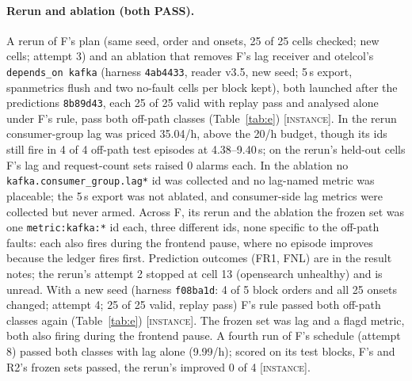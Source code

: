 \documentclass{ceurart}
\newcommand{\scope}[1]{\textsc{[#1]}}
\begin{document}
\paragraph{Rerun and ablation (both PASS).} %
A rerun of F's plan (same seed, order and onsets, 25 of 25 cells checked; new cells; attempt 3) and an ablation that removes
F's lag receiver and otelcol's \texttt{depends\_on kafka} (harness \texttt{4ab4433}, reader v3.5, new seed; 5\,s export,
spanmetrics flush and two no-fault cells per block kept), both launched after the predictions \texttt{8b89d43}, each 25 of
25 valid with replay pass and analysed alone under F's rule, pass both off-path classes (Table~\ref{tab:e})
\scope{instance}. In the rerun consumer-group lag was priced 35.04/h, above the 20/h budget, though its ids still fire in 4
of 4 off-path test episodes at 4.38--9.40\,s; on the rerun's held-out cells F's lag and request-count sets raised 0 alarms
each. In the ablation no \texttt{kafka.consumer\_group.lag*} id was collected and no lag-named metric was placeable; the
5\,s export was not ablated, and consumer-side lag metrics were collected but never armed. Across F, its rerun and the
ablation the frozen set was one \texttt{metric:kafka:*} id each, three different ids, none specific to the off-path faults:
each also fires during the frontend pause, where no episode improves because the ledger fires first. Prediction outcomes
(FR1, FNL) are in the result notes; the rerun's attempt 2 stopped at cell 13 (opensearch unhealthy) and is unread.
With a new seed (harness \texttt{f08ba1d}: 4 of 5 block orders and all 25 onsets changed; attempt 4; 25 of 25 valid, replay pass)
F's rule passed both off-path classes again (Table~\ref{tab:e}) \scope{instance}. The frozen set was lag and a flagd metric,
both also firing during the frontend pause. A fourth run of F's schedule (attempt 8) passed both classes with lag alone
(9.99/h); scored on its test blocks, F's and R2's frozen sets passed, the rerun's  improved 0 of 4
\scope{instance}. %
\end{document}
